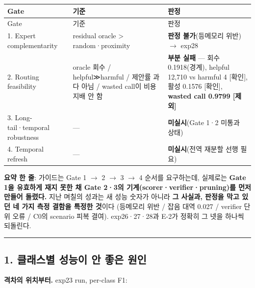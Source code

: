 \begingroup
\footnotesize
\begin{longtable}{>{\raggedright\arraybackslash}p{}>{\raggedright\arraybackslash}p{}>{\raggedright\arraybackslash}p{}}
\toprule
Gate & 기준 & 판정 \\ \midrule
\endfirsthead
Gate & 기준 & 판정 \\ \midrule
\endhead
{}1. Expert complementarity & residual oracle > random·proximity & \textbf{판정 불가}(등메모리 위반)  \ensuremath{\rightarrow}  exp28 \\
{}2. Routing feasibility & oracle 회수 /\allowbreak{} helpful≫harmful /\allowbreak{} 제안률 과다 아님 /\allowbreak{} wasted call이 비용 지배 안 함 & \textbf{부분 실패} — 회수 0.1918(경계), helpful 12,710 vs harmful 4 [확인], 활성 0.1576 [확인], \textbf{wasted call 0.9799 [제외]} \\
{}3. Long-tail·temporal robustness & — & \textbf{미실시}(Gate 1·2 미통과 상태) \\
{}4. Temporal refresh & — & \textbf{미실시}(전역 재분할 선행 필요) \\
\bottomrule
\end{longtable}
\endgroup
\textbf{요약 한 줄}: 가이드는 Gate 1  \ensuremath{\rightarrow}  2  \ensuremath{\rightarrow}  3  \ensuremath{\rightarrow}  4 순서를 요구하는데, 실제로는 \textbf{Gate 1을 유효하게 재지 못한 채 Gate 2·3의 기계(scorer·verifier·pruning)를 먼저 만들어 돌렸다.} 지난 며칠의 성과는 새 성능 숫자가 아니라 \textbf{그 사실과, 판정을 막고 있던 네 가지 측정 결함을 특정한 것}이다 (등메모리 위반 /\allowbreak{} 잡음 대역 0.027 /\allowbreak{} verifier 단위 오류 /\allowbreak{} C0의 scenario 피복 결여). exp26·27·28과 E-2가 정확히 그 넷을 하나씩 되돌린다.


\medskip\hrule\medskip
\subsection{1. 클래스별 성능이 안 좋은 원인}
\textbf{격차의 위치부터.} exp23 run, per-class F1:

